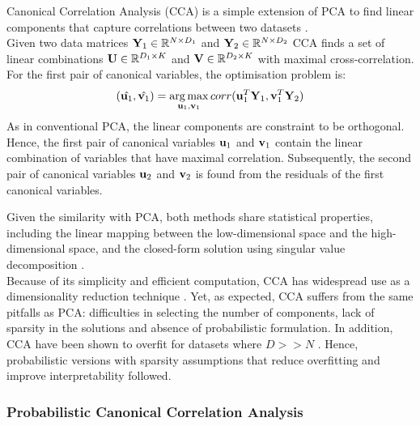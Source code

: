Canonical Correlation Analysis (CCA) is a simple extension of PCA to find linear components that capture correlations between two datasets \cite{Hotteling1936,Hardle2007}.\\
Given two data matrices ${\bf Y}_1 \in \mathbb{R}^{N \times D_1}$ and ${\bf Y}_2 \in \mathbb{R}^{N \times D_2}$ CCA finds a set of linear combinations ${\bf U} \in \mathbb{R}^{D_1 \times K}$ and ${\bf V} \in \mathbb{R}^{D_2 \times K}$ with maximal cross-correlation.
For the first pair of canonical variables, the optimisation problem is:
\[
	(\hat{{\bf u}_1}, \hat{{\bf v}_1}) = \operatorname*{arg\,max}_{{\bf u}_1,{\bf v}_1} corr({\bf u}_{1}^T {\bf Y}_1, {\bf v}_{1}^T {\bf Y}_2)
\]
As in conventional PCA, the linear components are constraint to be orthogonal. Hence, the first pair of canonical variables ${\bf u}_1$ and ${\bf v}_1$ contain the linear combination of variables that have maximal correlation. Subsequently, the second pair of canonical variables ${\bf u}_2$ and ${\bf v}_2$ is found from the residuals of the first canonical variables.

Given the similarity with PCA, both methods share statistical properties, including the linear mapping between the low-dimensional space and the high-dimensional space, and the closed-form solution using singular value decomposition \cite{Hotteling1936,Hardle2007}.\\
Because of its simplicity and efficient computation, CCA has widespread use as a dimensionality reduction technique \cite{Hardle2007}. Yet, as expected, CCA suffers from the same pitfalls as PCA: difficulties in selecting the number of components, lack of sparsity in the solutions and absence of probabilistic formulation. In addition, CCA have been shown to overfit for datasets where $D>>N$ \cite{McCabe2018,Guo2016}. Hence, probabilistic versions with sparsity assumptions that reduce overfitting and improve interpretability followed.


\subsubsection{Probabilistic Canonical Correlation Analysis} \label{section_probabilisticCCA}

